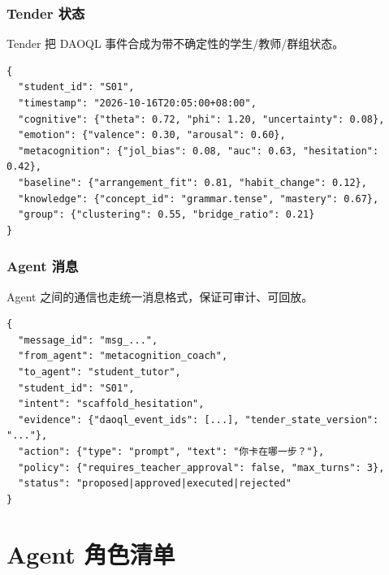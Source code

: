 \documentclass[UTF8,a4paper,11pt]{ctexart}
\begin{document}
\subsubsection{Tender 状态}

Tender 把 DAOQL 事件合成为带不确定性的学生/教师/群组状态。

\begin{verbatim}
{
  "student_id": "S01",
  "timestamp": "2026-10-16T20:05:00+08:00",
  "cognitive": {"theta": 0.72, "phi": 1.20, "uncertainty": 0.08},
  "emotion": {"valence": 0.30, "arousal": 0.60},
  "metacognition": {"jol_bias": 0.08, "auc": 0.63, "hesitation": 0.42},
  "baseline": {"arrangement_fit": 0.81, "habit_change": 0.12},
  "knowledge": {"concept_id": "grammar.tense", "mastery": 0.67},
  "group": {"clustering": 0.55, "bridge_ratio": 0.21}
}
\end{verbatim}

\subsubsection{Agent 消息}

Agent 之间的通信也走统一消息格式，保证可审计、可回放。

\begin{verbatim}
{
  "message_id": "msg_...",
  "from_agent": "metacognition_coach",
  "to_agent": "student_tutor",
  "student_id": "S01",
  "intent": "scaffold_hesitation",
  "evidence": {"daoql_event_ids": [...], "tender_state_version": "..."},
  "action": {"type": "prompt", "text": "你卡在哪一步？"},
  "policy": {"requires_teacher_approval": false, "max_turns": 3},
  "status": "proposed|approved|executed|rejected"
}
\end{verbatim}

\section{Agent 角色清单}
\end{document}
